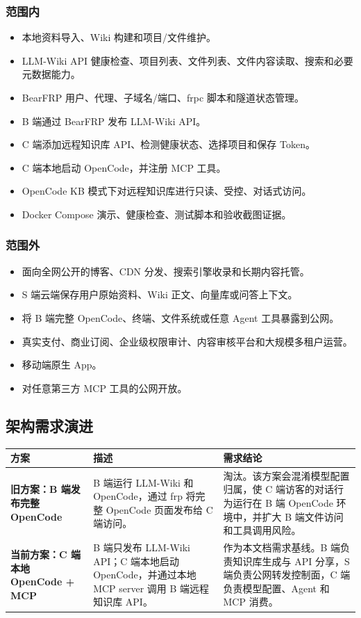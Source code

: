 \documentclass[UTF8,a4paper,12pt,fontset=fandol]{ctexart}
\newcommand{\code}[1]{\texorpdfstring{\begingroup\footnotesize\detokenize{#1}\endgroup}{#1}}
\begin{document}
\subsubsection{范围内}
\begin{itemize}
  \item 本地资料导入、Wiki 构建和项目/文件维护。
  \item LLM-Wiki API 健康检查、项目列表、文件列表、文件内容读取、搜索和必要元数据能力。
  \item BearFRP 用户、代理、子域名/端口、frpc 脚本和隧道状态管理。
  \item B 端通过 BearFRP 发布 LLM-Wiki API。
  \item C 端添加远程知识库 API、检测健康状态、选择项目和保存 Token。
  \item C 端本地启动 OpenCode，并注册 \code{llm_wiki_*} MCP 工具。
  \item OpenCode KB 模式下对远程知识库进行只读、受控、对话式访问。
  \item Docker Compose 演示、健康检查、测试脚本和验收截图证据。
\end{itemize}

\subsubsection{范围外}
\begin{itemize}
  \item 面向全网公开的博客、CDN 分发、搜索引擎收录和长期内容托管。
  \item S 端云端保存用户原始资料、Wiki 正文、向量库或问答上下文。
  \item 将 B 端完整 OpenCode、终端、文件系统或任意 Agent 工具暴露到公网。
  \item 真实支付、商业订阅、企业级权限审计、内容审核平台和大规模多租户运营。
  \item 移动端原生 App。
  \item 对任意第三方 MCP 工具的公网开放。
\end{itemize}

\subsection{架构需求演进}
\begin{longtable}{>{\bfseries}p{3.2cm}p{5.4cm}p{5.6cm}}
\toprule
方案 & 描述 & 需求结论 \\
\midrule
旧方案：B 端发布完整 OpenCode & B 端运行 LLM-Wiki 和 OpenCode，通过 frp 将完整 OpenCode 页面发布给 C 端访问。 & 淘汰。该方案会混淆模型配置归属，使 C 端访客的对话行为运行在 B 端 OpenCode 环境中，并扩大 B 端文件访问和工具调用风险。 \\
当前方案：C 端本地 OpenCode + MCP & B 端只发布 LLM-Wiki API；C 端本地启动 OpenCode，并通过本地 MCP server 调用 B 端远程知识库 API。 & 作为本文档需求基线。B 端负责知识库生成与 API 分享，S 端负责公网转发控制面，C 端负责模型配置、Agent 和 MCP 消费。 \\
\bottomrule
\end{longtable}
\end{document}
